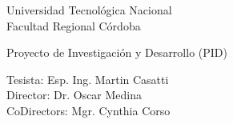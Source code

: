 \thispagestyle{empty}

\begin{center}
	\vspace*{3cm}
	
	
	\vspace{2cm}
	
	\LARGE{Universidad Tecnológica Nacional\\
		Facultad Regional Córdoba}
	
	\vspace{2cm}
	
	\LARGE{Proyecto de Investigación y Desarrollo (PID)}
	
	\vspace{2cm}
\end{center}

\begin{flushright} 
	\Large{
		Tesista: Esp. Ing. Martin Casatti\\
		Director: Dr. Oscar Medina\\
		CoDirectors: Mgr. Cynthia Corso
	}
\end{flushright} 
